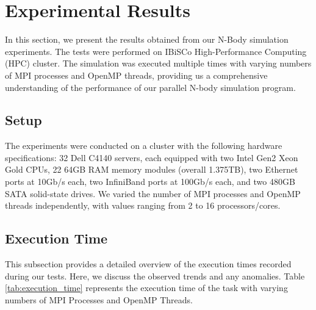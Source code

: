 \documentclass{solutionclass} %
\begin{document}
\divider
\section{Experimental Results}

In this section, we present the results obtained from our N-Body simulation experiments. The tests were performed on IBiSCo High-Performance Computing (HPC) cluster. The simulation was executed multiple times with varying numbers of MPI processes and OpenMP threads, providing us a comprehensive understanding of the performance of our parallel N-body simulation program.

\setcounter{subsection}{0} %
\subsection{Setup}
The experiments were conducted on a cluster with the following hardware specifications: 32 Dell C4140 servers, each equipped with two Intel Gen2 Xeon Gold CPUs, 22 64GB RAM memory modules (overall 1.375TB), two Ethernet ports at 10Gb/s each, two InfiniBand ports at 100Gb/s each, and two 480GB SATA solid-state drives. 
We varied the number of MPI processes and OpenMP threads independently, with values ranging from 2 to 16 processors/cores.

\subsection{Execution Time}
This subsection provides a detailed overview of the execution times recorded during our tests. Here, we discuss the observed trends and any anomalies. Table \ref{tab:execution_time} represents the execution time of the task with varying numbers of MPI Processes and OpenMP Threads.
\end{document}
